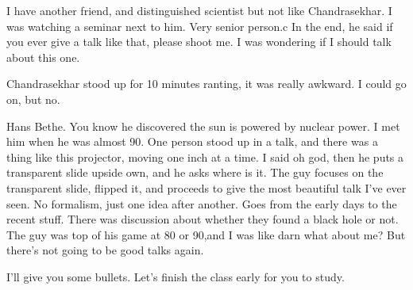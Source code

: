 I have another friend,
and distinguished scientist but not like Chandrasekhar.
I was watching a seminar next to him.
Very senior person.c
In the end,
he said if you ever give a talk like that,
please shoot me.
I was wondering if I should talk about this one.

Chandrasekhar stood up for 10 minutes ranting,
it was really awkward.
I could go on, but no.

Hans Bethe.
You know he discovered the sun is powered by nuclear power.
I met him when he was almost 90.
One person stood up in a talk,
and there was a thing like this projector,
moving one inch at a time.
I said oh god,
then he puts a transparent slide upside own,
and he asks where is it.
The guy focuses on the transparent slide,
flipped it,
and proceeds to give the most beautiful talk I've ever seen.
No formalism,
just one idea after another.
Goes from the early days to the recent stuff.
There was discussion about whether they found a black hole or not.
The guy was top of his game at 80 or 90,and I was like darn what about me?
But there's not going to be good talks again.

I'll give you some bullets.
Let's finish the class early for you to study.

